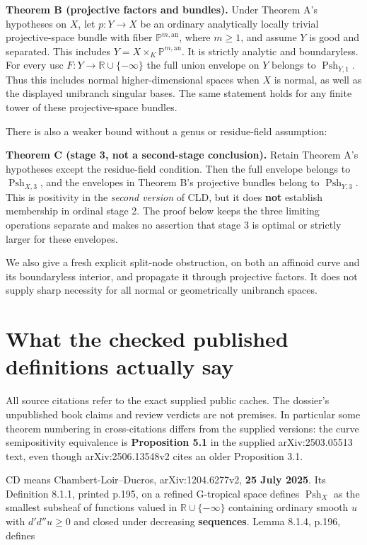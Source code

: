 \documentclass[
  11pt,
]{article}
\begin{document}
\textbf{Theorem B (projective factors and bundles).} Under Theorem A's
hypotheses on \(X\), let \(p:Y\to X\) be an ordinary analytically
locally trivial projective-space bundle with fiber
\(\mathbb P^{m,\mathrm{an}}\), where \(m\geq1\), and assume \(Y\) is
good and separated. This includes
\(Y=X\times_K\mathbb P^{m,\mathrm{an}}\). It is strictly analytic and
boundaryless. For every usc \(F:Y\to\mathbb R\cup\{-\infty\}\) the full
union envelope on \(Y\) belongs to \(\operatorname{Psh}_{Y,1}\). Thus
this includes normal higher-dimensional spaces when \(X\) is normal, as
well as the displayed unibranch singular bases. The same statement holds
for any finite tower of these projective-space bundles.

There is also a weaker bound without a genus or residue-field
assumption:

\textbf{Theorem C (stage 3, not a second-stage conclusion).} Retain
Theorem A's hypotheses except the residue-field condition. Then the full
envelope belongs to \(\operatorname{Psh}_{X,3}\), and the envelopes in
Theorem B's projective bundles belong to \(\operatorname{Psh}_{Y,3}\).
This is positivity in the \emph{second version} of CLD, but it does
\textbf{not} establish membership in ordinal stage 2. The proof below
keeps the three limiting operations separate and makes no assertion that
stage 3 is optimal or strictly larger for these envelopes.

We also give a fresh explicit split-node obstruction, on both an
affinoid curve and its boundaryless interior, and propagate it through
projective factors. It does not supply sharp necessity for all normal or
geometrically unibranch spaces.

\section{What the checked published definitions actually
say}\label{what-the-checked-published-definitions-actually-say}

All source citations refer to the exact supplied public caches. The
dossier's unpublished book claims and review verdicts are not premises.
In particular some theorem numbering in cross-citations differs from the
supplied versions: the curve semipositivity equivalence is
\textbf{Proposition 5.1} in the supplied arXiv:2503.05513 text, even
though arXiv:2506.13548v2 cites an older Proposition 3.1.

CD means Chambert-Loir--Ducros, arXiv:1204.6277v2, \textbf{25 July
2025}. Its Definition 8.1.1, printed p.195, on a refined G-tropical
space defines \(\operatorname{Psh}_X\) as the smallest subsheaf of
functions valued in \(\mathbb R\cup\{-\infty\}\) containing ordinary
smooth \(u\) with \(d'd''u\geq0\) and closed under decreasing
\textbf{sequences}. Lemma 8.1.4, p.196, defines
\end{document}
